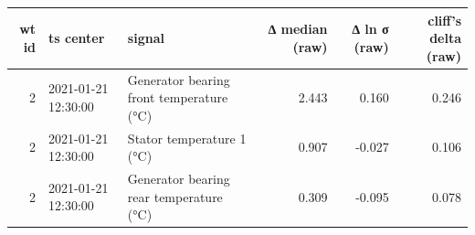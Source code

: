 \begin{tabular}{rllrrr}
\toprule
wt id & ts center & signal & ∆ median (raw) & ∆ ln σ  (raw) & cliff's delta (raw) \\
\midrule
2 & 2021-01-21 12:30:00 & Generator bearing front temperature (°C) & 2.443 & 0.160 & 0.246 \\
2 & 2021-01-21 12:30:00 & Stator temperature 1 (°C) & 0.907 & -0.027 & 0.106 \\
2 & 2021-01-21 12:30:00 & Generator bearing rear temperature (°C) & 0.309 & -0.095 & 0.078 \\
\bottomrule
\end{tabular}
